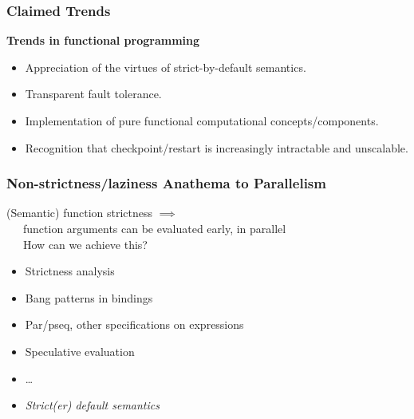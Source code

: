 \documentclass{beamer}
\begin{document}
\begin{frame}
\frametitle{Claimed Trends}
\textbf{Trends in functional programming}
\begin{itemize}
  \item<1-> Appreciation of the virtues of strict-by-default semantics.
    \\
  \item<2-> Transparent fault tolerance.
    \\
\end{itemize}
\begin{itemize}
  \item<4-> Implementation of pure functional computational concepts/components.    
  \item<4-> Recognition that checkpoint/restart is increasingly intractable and unscalable.
    \\
\end{itemize}
\end{frame}


\begin{frame}
\frametitle{Non-strictness/laziness Anathema to Parallelism}
(Semantic) function strictness $\implies$ \\
\ \ \ function arguments can be evaluated early, in parallel\\
\ \ \ How can we achieve this?
\begin{itemize}
  \item<2-> Strictness analysis
    \\
  \item<3-> Bang patterns in bindings
    \\
  \item<4-> Par/pseq, other specifications on expressions
    \\
  \item<5-> Speculative evaluation
    \\
  \item<6-> \ldots
  \item<7-> \emph{Strict(er) default semantics}
\end{itemize}
\end{frame}
\end{document}
